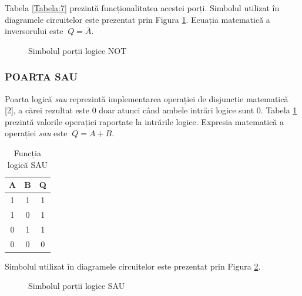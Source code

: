 \documentclass[12pt]{article}
\begin{document}
Tabela \ref{Tabela:7} prezintă funcționalitatea acestei porți. Simbolul utilizat în diagramele circuitelor este prezentat prin Figura \ref{Figura:5}. Ecuația matematică a inversorului este $\ Q = \overline{A}$.


 \begin{figure}[h!]
 \centering
 \caption{Simbolul porții logice NOT}
 \label{Figura:5}
\end{figure}
 
\subsubsection{POARTA SAU}
Poarta logică \textit{sau} reprezintă implementarea operației de disjuncție matematică [2], a cărei rezultat este 0 doar atunci când ambele intrări logice sunt 0. Tabela \ref{Tabela:8} prezintă valorile operației raportate la intrările logice. Expresia matematică a operației \textit{sau} este $\ Q = A+B$.
 \begin{table}[h]
\centering
\begin{tabular}{ ||c|c|c|| }
 \hline
 A & B & Q\\ 
 \hline  \hline
 1 & 1 & 1 \\
 \hline
 1 & 0 & 1 \\
 \hline
 0 & 1 & 1 \\
 \hline 
 0 & 0 & 0 \\
 \hline
\end{tabular}
\caption{Funcția logică SAU}
\label{Tabela:8}
\end{table}

Simbolul utilizat în diagramele circuitelor este prezentat prin Figura \ref{Figura:6}.

 \begin{figure}[h!]
 \centering
 \caption{Simbolul porții logice SAU}
 \label{Figura:6}
 \end{figure}
 
\end{document}
